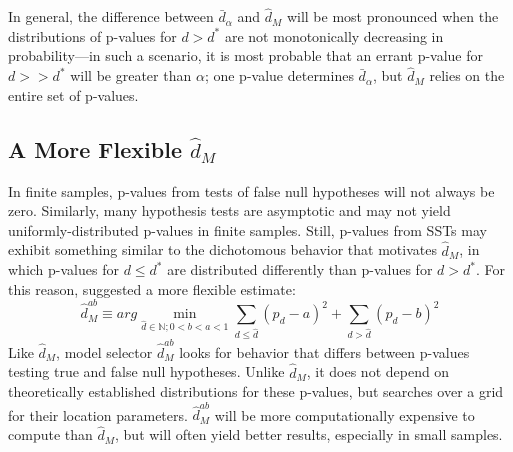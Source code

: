 \documentclass[12pt]{article}\usepackage[]{graphicx}\usepackage[]{color}
\newcommand{\dalphaU}{\bar{d}_\alpha}
\newcommand{\dstar}{d^*}
\newcommand{\dhat}{\hat{d}}
\newcommand{\dhatm}{\hat{d}_M}
\newcommand{\dhatmab}{\hat{d}^{ab}_M}
\begin{document}
In general, the difference between $\dalphaU$ and $\dhatm$ will be
most pronounced when the distributions of p-values for $d>\dstar$ are
not monotonically decreasing in probability---in such a scenario, it
is most probable that an errant p-value for $d>>\dstar$ will be
greater than $\alpha$; one p-value determines $\dalphaU$, but
$\dhatm$ relies on the entire set of p-values.

\subsection{A More Flexible $\dhatm$}
In finite samples, p-values from tests of false null hypotheses will
not always be zero.
Similarly, many hypothesis tests are asymptotic and may not yield
uniformly-distributed p-values in finite samples.
Still, p-values from SSTs may exhibit something similar to the
dichotomous behavior that motivates $\dhatm$, in which p-values for
$d\le \dstar$ are distributed differently than p-values for
$d>\dstar$.
For this reason, \citet{mallik} suggested a more flexible estimate:
\begin{equation}
  \dhatmab \equiv arg\displaystyle\min_{\dhat\in \mathbb{N}; 0<b<a<1}
  \displaystyle\sum_{d\le \dhat} ( p_d
  -a)^2+\displaystyle\sum_{d>\dhat} (p_d-b)^2
\end{equation}
Like $\dhatm$, model selector $\dhatmab$ looks for behavior that
differs between p-values testing true and false null hypotheses.
Unlike $\dhatm$, it does not depend on theoretically established
distributions for these p-values, but searches over a grid for their
location parameters.
$\dhatmab$ will be more computationally expensive to compute than
$\dhatm$, but will often yield better results, especially in small
samples.
\end{document}
